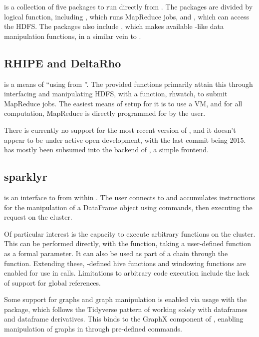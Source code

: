  is a collection of five packages to run  directly from
\R{}\cite{analytics:_rhadoop_wiki}.
The packages are divided by logical function, including , which runs MapReduce jobs, and , which can access the HDFS.
The packages also include , which makes available -like data manipulation functions, in a similar vein to .

\subsection{RHIPE and DeltaRho}\label{subsec:rhipe-deltarho}

 is a means of ``using  from \R{}''\cite{deltarho:_rhipe}.
The provided functions primarily attain this through interfacing and manipulating HDFS, with a function, rhwatch, to submit MapReduce jobs.
The easiest means of setup for it is to use a VM, and for all  computation, MapReduce is directly programmed for by the user.

There is currently no support for the most recent version of , and it doesn't appear to be under active open development, with the last commit being 2015.
 has mostly been subsumed into the backend of
, a simple frontend.

\subsection{sparklyr}\label{subsec:sparklyr}

 is an interface to  from within \R{}\cite{luraschi20}.
The user connects to  and accumulates instructions for the manipulation of a  DataFrame object using  commands, then executing the request on the  cluster.

Of particular interest is the capacity to execute arbitrary \R{} functions on the  cluster.
This can be performed directly, with the  function, taking a user-defined function as a formal parameter.
It can also be used as part of a  chain through the  function.
Extending these, -defined hive functions and windowing functions are enabled for use in  calls.
Limitations to arbitrary code execution include the lack of support for global references.

Some support for graphs and graph manipulation is enabled via usage with the  package, which follows the Tidyverse pattern of working solely with dataframes and dataframe derivatives\cite{kuo18}.
This binds to the GraphX component of , enabling manipulation of graphs in  through pre-defined commands.

